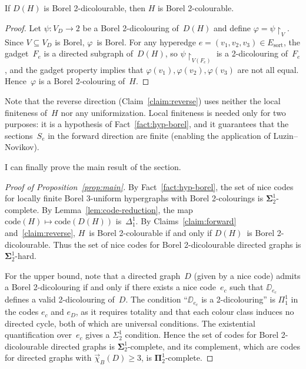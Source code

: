 \begin{claim}\label{claim:reverse}
If $D(H)$ is Borel 2-dicolourable, then $H$ is Borel 2-colourable.
\end{claim}

\begin{proof}
Let $\psi\colon V_D\to 2$ be a Borel 2-dicolouring of~$D(H)$ and define $\varphi = \psi\restriction_V$.
Since $V\subseteq V_D$ is Borel, $\varphi$~is Borel.
For any hyperedge $e=(v_1,v_2,v_3)\in E_{\mathrm{sort}}$, the gadget~$F_e$ is a directed subgraph of~$D(H)$, so $\psi\restriction_{V(F_e)}$ is a 2-dicolouring of~$F_e$, and the gadget property implies that $\varphi(v_1),\varphi(v_2),\varphi(v_3)$ are not all equal.
Hence~$\varphi$ is a Borel 2-colouring of~$H$.
\end{proof}

\begin{remark}\label{rmk:no-lf-reverse}
Note that the reverse direction (Claim~\ref{claim:reverse}) uses neither the local finiteness of~$H$ nor any uniformization.
Local finiteness is needed only for two purposes: it is a hypothesis of Fact~\ref{fact:hyp-borel}, and it guarantees that the sections~$S_e$ in the forward direction are finite (enabling the application of Luzin--Novikov).
\end{remark}

I can finally prove the main result of the section.

\begin{proof}[Proof of Proposition~\ref{prop:main}]
By Fact~\ref{fact:hyp-borel}, the set of nice codes for locally finite Borel 3-uniform hypergraphs with Borel 2-colourings is $\mathbf\Sigma^1_2$-complete.
By Lemma~\ref{lem:code-reduction}, the map $\mathrm{code}(H)\mapsto\mathrm{code}(D(H))$ is~$\Delta^1_1$.
By Claims~\ref{claim:forward} and~\ref{claim:reverse}, $H$~is Borel 2-colourable if and only if $D(H)$~is Borel 2-dicolourable.
Thus the set of nice codes for Borel 2-dicolourable directed graphs is $\mathbf\Sigma^1_2$-hard.

For the upper bound, note that a directed graph~$D$ (given by a nice code) admits a Borel 2-dicolouring if and only if there exists a nice code~$e_c$ such that $\DD_{e_c}$ defines a valid 2-dicolouring of~$D$.
The condition ``$\DD_{e_c}$ is a 2-dicolouring'' is $\Pi^1_1$ in the codes $e_c$ and $e_D$, as it requires totality and that each colour class induces no directed cycle, both of which are universal conditions.
The existential quantification over~$e_c$ gives a $\Sigma^1_2$ condition.
Hence the set of codes for Borel 2-dicolourable directed graphs is $\mathbf\Sigma^1_2$-complete, and its complement, which are codes for directed graphs with $\vec\chi_B(D)\geq 3$, is $\mathbf\Pi^1_2$-complete.
\end{proof}

